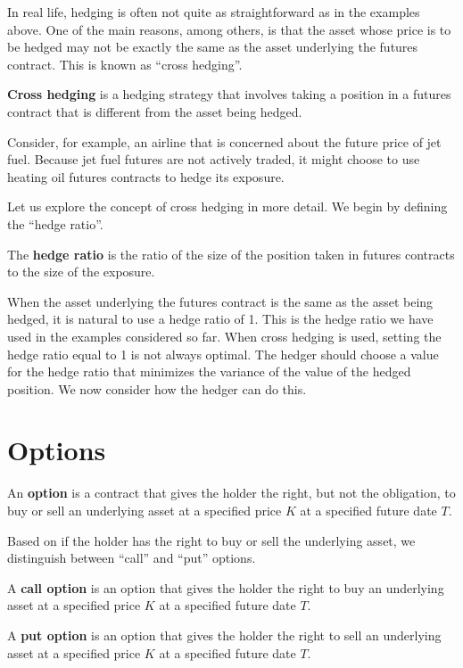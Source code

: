 In real life, hedging is often not quite as straightforward as in the examples above. One of the main reasons, among
others, is that the asset whose price is to be hedged may not be exactly the same as the asset underlying the futures
contract. This is known as ``cross hedging''.

\textbf{Cross hedging} is a hedging strategy that involves taking a position in a futures contract that is different
from the asset being hedged.
\ed

\be
Consider, for example, an airline that is concerned about the future price of jet fuel. Because jet fuel futures are
not actively traded, it might choose to use heating oil futures contracts to hedge its exposure.
\ee

Let us explore the concept of cross hedging in more detail. We begin by defining the ``hedge ratio''.

The \textbf{hedge ratio} is the ratio of the size of the position taken in futures contracts to the size of the
exposure.
\ed

When the asset underlying the futures contract is the same as the asset being hedged, it is natural to use a hedge
ratio of 1. This is the hedge ratio we have used in the examples considered so far. When cross hedging is used,
setting the hedge ratio equal to 1 is not always optimal. The hedger should choose a value for the hedge ratio that
minimizes the variance of the value of the hedged position. We now consider how the hedger can do this.

\section{Options}

\bd[Option]
An \textbf{option} is a contract that gives the holder the right, but not the obligation, to buy or sell an underlying
asset at a specified price $K$ at a specified future date $T$.
\ed

Based on if the holder has the right to buy or sell the underlying asset, we distinguish between ``call'' and ``put''
options.

A \textbf{call option} is an option that gives the holder the right to buy an underlying asset at a specified price $K$
at a specified future date $T$.
\ed

A \textbf{put option} is an option that gives the holder the right to sell an underlying asset at a specified price $K$
at a specified future date $T$.
\ed

